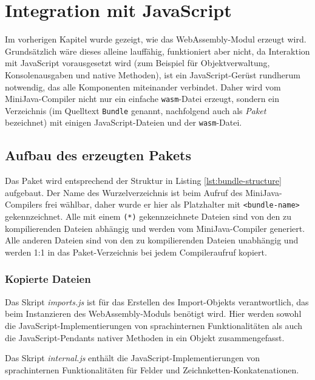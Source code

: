 \chapter{Integration mit JavaScript}
\label{cha:JavaScript-Integration}

Im vorherigen Kapitel wurde gezeigt, wie das WebAssembly-Modul erzeugt wird. Grundsätzlich wäre dieses alleine lauffähig, funktioniert aber nicht, da Interaktion mit Ja\-va\-Script vorausgesetzt wird (zum Beispiel für Objektverwaltung, Konsolenausgaben und native Methoden), ist ein JavaScript-Gerüst rundherum notwendig, das alle Komponenten miteinander verbindet. Daher wird vom MiniJava-Compiler nicht nur ein einfache \lstinline{wasm}-Datei erzeugt, sondern ein Verzeichnis (im Quelltext \lstinline{Bundle} genannt, nachfolgend auch als \emph{Paket} bezeichnet) mit einigen JavaScript-Dateien und der \lstinline{wasm}-Datei.

\section{Aufbau des erzeugten Pakets}

Das Paket wird entsprechend der Struktur in Listing \ref{lst:bundle-structure} aufgebaut. Der Name des Wurzelverzeichnis ist beim Aufruf des MiniJava-Compilers frei wählbar, daher wurde er hier als Platzhalter mit \lstinline{<bundle-name>} gekennzeichnet. Alle mit einem \lstinline{(*)} gekennzeichnete Dateien sind von den zu kompilierenden Dateien abhängig und werden vom MiniJava-Compiler generiert. Alle anderen Dateien sind von den zu kompilierenden Dateien unabhängig und werden 1:1 in das Paket-Verzeichnis bei jedem Compileraufruf kopiert.



\subsection{Kopierte Dateien}

Das Skript \emph{imports.js} ist für das Erstellen des Import-Objekts verantwortlich, das beim Instanzieren des WebAssembly-Moduls benötigt wird. Hier werden sowohl die Ja\-va\-Script-Im\-ple\-men\-tie\-rungen von sprachinternen Funktionalitäten als auch die Ja\-va\-Script-Pen\-dants nativer Methoden in ein Objekt zusammengefasst.

Das Skript \emph{internal.js} enthält die JavaScript-Implementierungen von sprachinternen Funktionalitäten für Felder und Zeichnketten-Konkatenationen.

